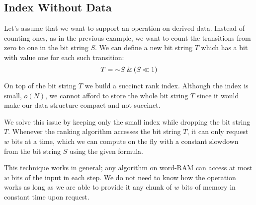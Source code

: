 \subsection{\label{ss:index-without-data}Index Without Data}

Let's assume that we want to support an operation on derived data.
Instead of counting ones, as in the previous example, we want to count the transitions from zero to one in the bit string $S$.
We can define a new bit string $T$ which has a bit with value one for each such transition:
$$ T = \mathord{\sim} S \mathbin{\&} (S \mathbin{\ll} 1)$$

On top of the bit string $T$ we build a succinct rank index.
Although the index is small, $o(N)$, we cannot afford to store the whole bit string $T$ since it would make our data structure compact and not succinct.

We solve this issue by keeping only the small index while dropping the bit string $T$.
Whenever the ranking algorithm accesses the bit string $T$, it can only request $w$ bits at a time, which we can compute on the fly with a constant slowdown from the bit string $S$ using the given formula.

This technique works in general; any algorithm on word-RAM can access at most $w$ bits of the input in each step.
We do not need to know how the operation works as long as we are able to provide it any chunk of $w$ bits of memory in constant time upon request.
